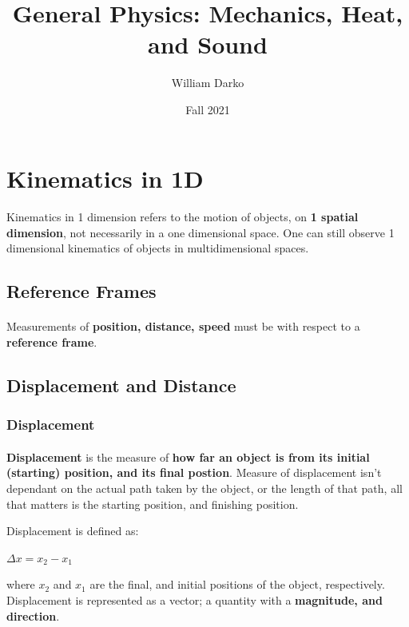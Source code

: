 \documentclass[12pt, a4paper]{article}
\title{General Physics: Mechanics, Heat, and Sound}
\author{William Darko}
\date{Fall 2021}
\begin{document}
\maketitle
\newpage

\tableofcontents

\newpage

\section{Kinematics in 1D}
\paragraph*{}
Kinematics in 1 dimension refers to the motion of objects, on \textbf{1 spatial dimension},
not necessarily in a one dimensional space. One can still observe 1 dimensional
kinematics of objects in multidimensional spaces.

\subsection{Reference Frames}
\paragraph*{}
Measurements of \textbf{position, distance, speed} must be with respect to 
a \textbf{reference frame}.

\subsection{Displacement and Distance}

\subsubsection{Displacement}
\paragraph*{}
\textbf{Displacement} is the measure of \textbf{how far an object is from its initial (starting)
position, and its final postion}. Measure of displacement isn't dependant on the actual path
taken by the object, or the length of that path, all that matters is the starting position, and finishing position.

Displacement is defined as:

{
    \centering
    $\Delta x = x_2 - x_1$

}
where $x_2$ and $x_1$ are the final, and initial positions of the object, respectively. Displacement
is represented as a vector; a quantity with a \textbf{magnitude, and direction}.
\end{document}

